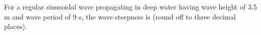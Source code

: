 \documentclass{article}
\begin{document}
For a regular sinusoidal wave propagating in deep water having wave height of 3.5 m and wave period of 9 s, the wave steepness is \underline{\hspace{1cm}} (round off to three decimal places).
\end{document}
